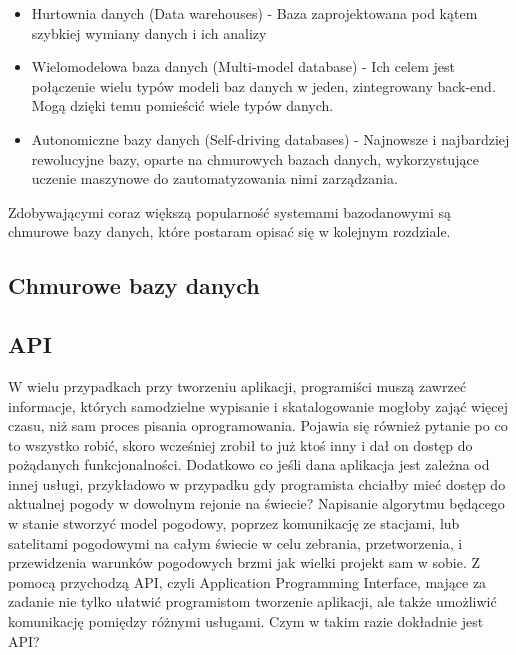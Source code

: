 \documentclass[12pt, a4paper]{article}
\begin{document}
\begin{sloppypar}
{{\begin{itemize}
      bazy danych, projektowane z myślą o dużej ilości transakcji wykonywanych pomiędzy
      wieloma użytkownikami. 
      \item Hurtownia danych (Data warehouses) - Baza zaprojektowana pod kątem
      szybkiej wymiany danych i ich analizy
      \item Wielomodelowa baza danych (Multi-model database) - Ich celem jest połączenie
      wielu typów modeli baz danych w jeden, zintegrowany back-end. Mogą dzięki temu
      pomieścić wiele typów danych.
      \item Autonomiczne bazy danych (Self-driving databases) - Najnowsze i najbardziej
      rewolucyjne bazy, oparte na chmurowych bazach danych, wykorzystujące uczenie
      maszynowe do zautomatyzowania nimi zarządzania.
    \end{itemize}

    Zdobywającymi coraz większą popularność systemami bazodanowymi są chmurowe bazy danych,
    które postaram opisać się w kolejnym rozdziale.
  }
  \subsection{Chmurowe bazy danych}
  {

  }
  \subsection{API}
  {
    W wielu przypadkach przy tworzeniu aplikacji, programiści muszą zawrzeć
    informacje, których samodzielne wypisanie i skatalogowanie mogłoby zająć
    więcej czasu, niż sam proces pisania oprogramowania. Pojawia się również
    pytanie po co to wszystko robić, skoro wcześniej zrobił to już ktoś inny i
    dał on dostęp do pożądanych funkcjonalności. Dodatkowo co jeśli dana aplikacja
    jest zależna od innej usługi, przykładowo w przypadku gdy programista chciałby
    mieć dostęp do aktualnej pogody w dowolnym rejonie na świecie? Napisanie algorytmu
    będącego w stanie stworzyć model pogodowy, poprzez komunikację ze stacjami,
    lub satelitami pogodowymi na całym świecie w celu zebrania, przetworzenia, i 
    przewidzenia warunków pogodowych brzmi jak wielki projekt sam w sobie.
    Z pomocą przychodzą API, czyli Application Programming Interface, mające za 
    zadanie nie tylko ułatwić programistom tworzenie aplikacji, ale także 
    umożliwić komunikację pomiędzy różnymi usługami. Czym w takim razie dokładnie jest API?

}}
\end{sloppypar}
\end{document}
